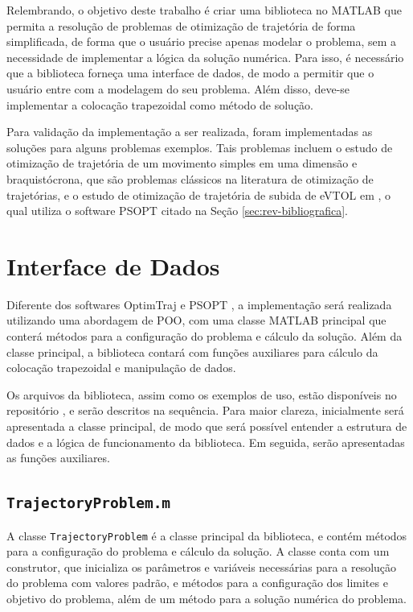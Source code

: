 Relembrando, o objetivo deste trabalho é criar uma biblioteca no MATLAB que permita a resolução de problemas de otimização de trajetória de forma simplificada, de forma que o usuário precise apenas modelar o problema, sem a necessidade de implementar a lógica da solução numérica. Para isso, é necessário que a biblioteca forneça uma interface de dados, de modo a permitir que o usuário entre com a modelagem do seu problema. Além disso, deve-se implementar a colocação trapezoidal como método de solução.

Para validação da implementação a ser realizada, foram implementadas as soluções para alguns problemas exemplos. Tais problemas incluem o estudo de otimização de trajetória de um movimento simples em uma dimensão e braquistócrona, que são problemas clássicos na literatura de otimização de trajetórias, e o estudo de otimização de trajetória de subida de eVTOL em \cite{costa_otimizacao_2023}, o qual utiliza o software PSOPT citado na Seção \ref{sec:rev-bibliografica}.

\section{Interface de Dados}
\label{sec:interface-dados}

Diferente dos softwares OptimTraj \cite{kelly_optimtraj_2022} e PSOPT \cite{becerra_psopt_2022}, a implementação será realizada utilizando uma abordagem de POO, com uma classe MATLAB principal que conterá métodos para a configuração do problema e cálculo da solução. Além da classe principal, a biblioteca contará com funções auxiliares para cálculo da colocação trapezoidal e manipulação de dados.

Os arquivos da biblioteca, assim como os exemplos de uso, estão disponíveis no repositório \cite{simplicio_hsimpliciotg-ita_2024}, e serão descritos na sequência. Para maior clareza, inicialmente será apresentada a classe principal, de modo que será possível entender a estrutura de dados e a lógica de funcionamento da biblioteca. Em seguida, serão apresentadas as funções auxiliares.

\subsection{\texttt{TrajectoryProblem.m}}
\label{subsec:classe-trajectoryproblem}

A classe \texttt{TrajectoryProblem} é a classe principal da biblioteca, e contém métodos para a configuração do problema e cálculo da solução. A classe conta com um construtor, que inicializa os parâmetros e variáveis necessárias para a resolução do problema com valores padrão, e métodos para a configuração dos limites e objetivo do problema, além de um método para a solução numérica do problema.

